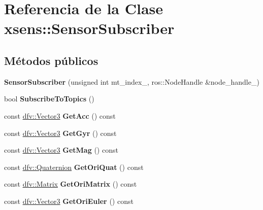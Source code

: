 \hypertarget{classxsens_1_1SensorSubscriber}{\section{\-Referencia de la \-Clase xsens\-:\-:\-Sensor\-Subscriber}
\label{classxsens_1_1SensorSubscriber}
}
\subsection*{\-Métodos públicos}
\begin{DoxyCompactItemize}
\item 
\hypertarget{classxsens_1_1SensorSubscriber_a490896e84094a4226988538c2a799314}{{\bfseries \-Sensor\-Subscriber} (unsigned int mt\-\_\-index\-\_\-, ros\-::\-Node\-Handle \&node\-\_\-handle\-\_\-)}\label{classxsens_1_1SensorSubscriber_a490896e84094a4226988538c2a799314}

\item 
\hypertarget{classxsens_1_1SensorSubscriber_a15b980e521c58ad11db118a8eabf5ea5}{bool {\bfseries \-Subscribe\-To\-Topics} ()}\label{classxsens_1_1SensorSubscriber_a15b980e521c58ad11db118a8eabf5ea5}

\item 
\hypertarget{classxsens_1_1SensorSubscriber_ad6748a26c4a7cbb0bf3fcda1a6a1cfcd}{const \hyperlink{classdfv_1_1Vector3}{dfv\-::\-Vector3} {\bfseries \-Get\-Acc} () const }\label{classxsens_1_1SensorSubscriber_ad6748a26c4a7cbb0bf3fcda1a6a1cfcd}

\item 
\hypertarget{classxsens_1_1SensorSubscriber_a1d1cd78134ca505ccb49ecc53bc70cc3}{const \hyperlink{classdfv_1_1Vector3}{dfv\-::\-Vector3} {\bfseries \-Get\-Gyr} () const }\label{classxsens_1_1SensorSubscriber_a1d1cd78134ca505ccb49ecc53bc70cc3}

\item 
\hypertarget{classxsens_1_1SensorSubscriber_a347cfc62fa536fb88a0e5bbea487c540}{const \hyperlink{classdfv_1_1Vector3}{dfv\-::\-Vector3} {\bfseries \-Get\-Mag} () const }\label{classxsens_1_1SensorSubscriber_a347cfc62fa536fb88a0e5bbea487c540}

\item 
\hypertarget{classxsens_1_1SensorSubscriber_a66affa9ed346bf1f344510da4fd1216c}{const \hyperlink{classdfv_1_1Quaternion}{dfv\-::\-Quaternion} {\bfseries \-Get\-Ori\-Quat} () const }\label{classxsens_1_1SensorSubscriber_a66affa9ed346bf1f344510da4fd1216c}

\item 
\hypertarget{classxsens_1_1SensorSubscriber_a7018e37f1e91e62e4c59b3130e13f1fe}{const \hyperlink{classdfv_1_1Matrix}{dfv\-::\-Matrix} {\bfseries \-Get\-Ori\-Matrix} () const }\label{classxsens_1_1SensorSubscriber_a7018e37f1e91e62e4c59b3130e13f1fe}

\item 
\hypertarget{classxsens_1_1SensorSubscriber_a54d87d7b8e0c828a45857493aaf0d268}{const \hyperlink{classdfv_1_1Vector3}{dfv\-::\-Vector3} {\bfseries \-Get\-Ori\-Euler} () const }\label{classxsens_1_1SensorSubscriber_a54d87d7b8e0c828a45857493aaf0d268}

\end{DoxyCompactItemize}


